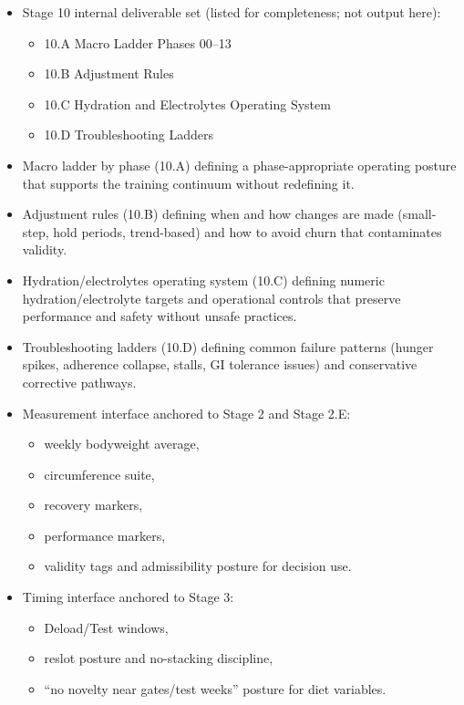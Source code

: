 \documentclass[10pt]{article}
\begin{document}
\begin{itemize}
\item Stage 10 internal deliverable set (listed for completeness; not output here):
  \begin{itemize}
  \item 10.A Macro Ladder Phases 00–13
  \item 10.B Adjustment Rules
  \item 10.C Hydration and Electrolytes Operating System
  \item 10.D Troubleshooting Ladders
  \end{itemize}
\item Macro ladder by phase (10.A) defining a phase-appropriate operating posture that supports the training continuum without redefining it.
\item Adjustment rules (10.B) defining when and how changes are made (small-step, hold periods, trend-based) and how to avoid churn that contaminates validity.
\item Hydration/electrolytes operating system (10.C) defining numeric hydration/electrolyte targets and operational controls that preserve performance and safety without unsafe practices.
\item Troubleshooting ladders (10.D) defining common failure patterns (hunger spikes, adherence collapse, stalls, GI tolerance issues) and conservative corrective pathways.
\item Measurement interface anchored to Stage 2 and Stage 2.E:
  \begin{itemize}
  \item weekly bodyweight average,
  \item circumference suite,
  \item recovery markers,
  \item performance markers,
  \item validity tags and admissibility posture for decision use.
  \end{itemize}
\item Timing interface anchored to Stage 3:
  \begin{itemize}
  \item Deload/Test windows,
  \item reslot posture and no-stacking discipline,
  \item “no novelty near gates/test weeks” posture for diet variables.
  \end{itemize}
\end{itemize}
\end{document}
